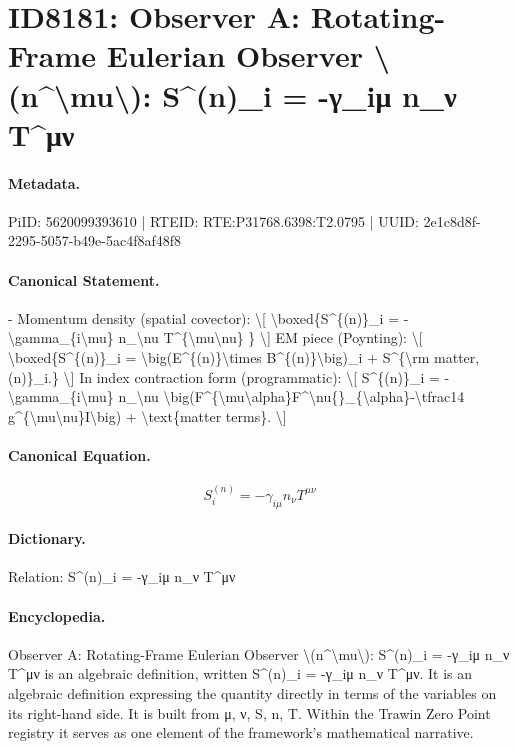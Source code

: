 \section*{ID8181: Observer A: Rotating-Frame Eulerian Observer \textbackslash{}(n\textasciicircum{}\textbackslash{}mu\textbackslash{}): S\textasciicircum{}(n)\_i = -γ\_iμ n\_ν T\textasciicircum{}μν}
\paragraph{Metadata.}
PiID: 5620099393610 | RTEID: RTE:P31768.6398:T2.0795 | UUID: 2e1c8d8f-2295-5057-b49e-5ac4f8af48f8

\paragraph{Canonical Statement.}
- Momentum density (spatial covector): \textbackslash{}[ \textbackslash{}boxed\{S\textasciicircum{}\{(n)\}\_i = -\textbackslash{}gamma\_\{i\textbackslash{}mu\} n\_\textbackslash{}nu T\textasciicircum{}\{\textbackslash{}mu\textbackslash{}nu\} \} \textbackslash{}] EM piece (Poynting): \textbackslash{}[ \textbackslash{}boxed\{S\textasciicircum{}\{(n)\}\_i = \textbackslash{}big(E\textasciicircum{}\{(n)\}\textbackslash{}times B\textasciicircum{}\{(n)\}\textbackslash{}big)\_i + S\textasciicircum{}\{\textbackslash{}rm matter,(n)\}\_i.\} \textbackslash{}] In index contraction form (programmatic): \textbackslash{}[ S\textasciicircum{}\{(n)\}\_i = -\textbackslash{}gamma\_\{i\textbackslash{}mu\} n\_\textbackslash{}nu \textbackslash{}big(F\textasciicircum{}\{\textbackslash{}mu\textbackslash{}alpha\}F\textasciicircum{}\textbackslash{}nu\{\}\_\{\textbackslash{}alpha\}-\textbackslash{}tfrac14 g\textasciicircum{}\{\textbackslash{}mu\textbackslash{}nu\}I\textbackslash{}big) + \textbackslash{}text\{matter terms\}. \textbackslash{}]

\paragraph{Canonical Equation.}
\[
\boxed{S^{(n)}_i = -\gamma_{i\mu} n_\nu T^{\mu\nu} }
\]

\paragraph{Dictionary.}
Relation: S\textasciicircum{}(n)\_i = -γ\_iμ n\_ν T\textasciicircum{}μν

\paragraph{Encyclopedia.}
Observer A: Rotating-Frame Eulerian Observer \textbackslash{}(n\textasciicircum{}\textbackslash{}mu\textbackslash{}): S\textasciicircum{}(n)\_i = -γ\_iμ n\_ν T\textasciicircum{}μν is an algebraic definition, written S\textasciicircum{}(n)\_i = -γ\_iμ n\_ν T\textasciicircum{}μν. It is an algebraic definition expressing the quantity directly in terms of the variables on its right-hand side. It is built from μ, ν, S, n, T. Within the Trawin Zero Point registry it serves as one element of the framework's mathematical narrative.
